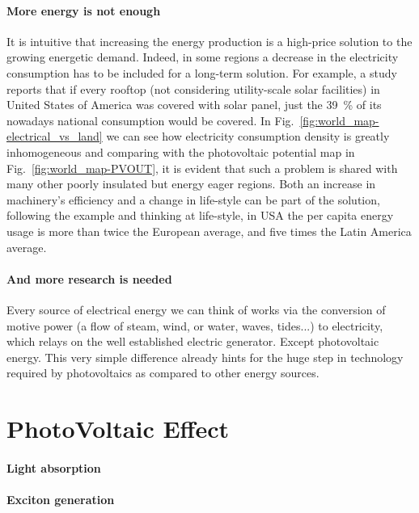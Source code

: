  \paragraph{More energy is not enough} It is intuitive that increasing the energy production is a high-price solution to the growing energetic demand.
 Indeed, in some regions a decrease in the electricity consumption has to be included for a long-term solution.
 For example, a study\cite{Margolis2016} reports that if every rooftop (not considering utility-scale solar facilities) in United States of America was covered with solar panel, just the 39~\% of its nowadays national consumption would be covered.
 In Fig.~\ref{fig:world_map-electrical_vs_land} we can see how electricity consumption density is greatly inhomogeneous and comparing with the photovoltaic potential map in Fig.~\ref{fig:world_map-PVOUT}, it is evident that such a problem is shared with many other poorly insulated but energy eager regions.
 Both an increase in machinery's efficiency and a change in life-style can be part of the solution, following the example and thinking at life-style, in USA the per capita energy usage is more than twice the European average, and five times the Latin America average.\cite{IEA}
 
 \paragraph{And more research is needed} Every source of electrical energy we can think of works via the conversion of motive power (a flow of steam, wind, or water, waves, tides...) to electricity, which relays on the well established electric generator. Except photovoltaic energy. This very simple difference already hints for the huge step in technology required by photovoltaics as compared to other energy sources.

\section{PhotoVoltaic Effect}

 \paragraph{Light absorption}

 \paragraph{Exciton generation} 
 
